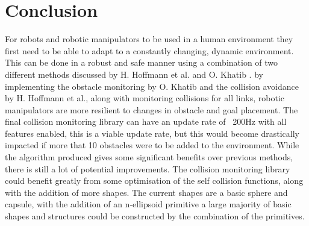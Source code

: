 \documentclass[a4paper, 10pt, conference]{ieeeconf}      %
\begin{document}
\section{Conclusion} %
For robots and robotic manipulators to be used in a human environment they first need to be able to adapt to a constantly changing, dynamic environment. This can be done in a robust and safe manner using a combination of two different methods discussed by H. Hoffmann et al.\cite{Hoffmann} and O. Khatib \cite{Khatib}. by implementing the obstacle monitoring by O. Khatib \cite{Khatib} and the collision avoidance by H. Hoffmann et al.\cite{Hoffmann}, along with monitoring collisions for all links, robotic manipulators are more resilient to changes in obstacle and goal placement. The final collision monitoring library can have an update rate of ~200Hz with all features enabled, this is a viable update rate, but this would become drastically impacted if more that 10 obstacles were to be added to the environment. %
While the algorithm produced gives some significant benefits over previous methods, there is still a lot of potential improvements. The collision monitoring library could benefit greatly from some optimisation of the self collision functions, along with the addition of more shapes. The current shapes are a basic sphere and capsule, with the addition of an n-ellipsoid primitive a large majority of basic shapes and structures could be constructed by the combination of the primitives. %


\addtolength{\textheight}{-12cm}   %

\end{document}
